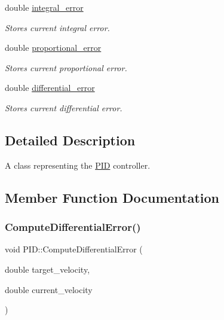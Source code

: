 \begin{DoxyCompactItemize}
\mbox{\label{classPID_a943cd212eec6928ce284f42c1d34d629}} 
double \hyperlink{classPID_a943cd212eec6928ce284f42c1d34d629}{integral\+\_\+error}
\begin{DoxyCompactList}\small\item\em Stores current integral error. \end{DoxyCompactList}\item 
\mbox{\label{classPID_a7c8e4c28da8061d6977412d0e8a7d2f2}} 
double \hyperlink{classPID_a7c8e4c28da8061d6977412d0e8a7d2f2}{proportional\+\_\+error}
\begin{DoxyCompactList}\small\item\em Stores current proportional error. \end{DoxyCompactList}\item 
\mbox{\label{classPID_a40170427ce17f12276bf8abe7b107c55}} 
double \hyperlink{classPID_a40170427ce17f12276bf8abe7b107c55}{differential\+\_\+error}
\begin{DoxyCompactList}\small\item\em Stores current differential error. \end{DoxyCompactList}\end{DoxyCompactItemize}


\subsection{Detailed Description}
A class representing the \hyperlink{classPID}{P\+ID} controller. 

\subsection{Member Function Documentation}
\mbox{\label{classPID_a6ad839da6f331ec367d1c379960d2aa5}} 
\subsubsection{\texorpdfstring{Compute\+Differential\+Error()}{ComputeDifferentialError()}}
{\footnotesize\ttfamily void P\+I\+D\+::\+Compute\+Differential\+Error (\begin{DoxyParamCaption}\item[{double}]{target\+\_\+velocity,  }\item[{double}]{current\+\_\+velocity }\end{DoxyParamCaption})\hspace{0.3cm}{\ttfamily [private]}}



